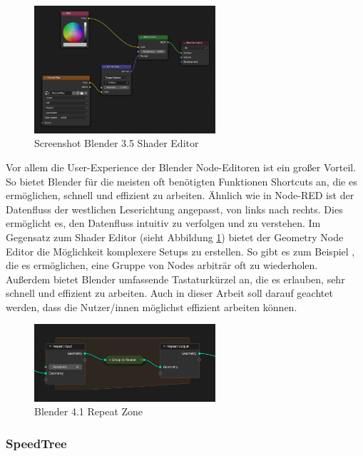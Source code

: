 \documentclass[ngerman]{article}
\begin{document}
\begin{figure}[htbp]
  \centering
  \includegraphics[width=0.6\textwidth]{./graphics/blender-shader.png}
  \caption{Screenshot Blender 3.5 Shader Editor}
  \label{fig:blender-shader}
\end{figure}

Vor allem die User-Experience der Blender Node-Editoren ist ein großer Vorteil. So bietet Blender für die meisten oft benötigten Funktionen Shortcuts an, die es ermöglichen, schnell und effizient zu arbeiten.
Ähnlich wie in Node-RED ist der Datenfluss der westlichen Leserichtung angepasst, von links nach rechts. Dies ermöglicht es, den Datenfluss intuitiv zu verfolgen und zu verstehen.
\br
Im Gegensatz zum Shader Editor (sieht Abbildung \ref{fig:blender-shader}) bietet der Geometry Node Editor die Möglichkeit komplexere Setups zu erstellen. So gibt es zum Beispiel , die es ermöglichen, eine Gruppe von Nodes arbiträr oft zu wiederholen.
\br
Außerdem bietet Blender umfassende Tastaturkürzel an, die es erlauben, sehr schnell und effizient zu arbeiten. Auch in dieser Arbeit soll darauf geachtet werden, dass die Nutzer/innen möglichst effizient arbeiten können.

\begin{figure}[htbp]
  \centering
  \includegraphics[width=0.6\textwidth]{./graphics/modeling_geometry-nodes_repeat_zone.png}
  \caption{Blender 4.1 Repeat Zone \cite{blenderRepeatZone}}
  \label{fig:blender-repeat}
\end{figure}

\pagebreak

\subsubsection{SpeedTree}
\end{document}
